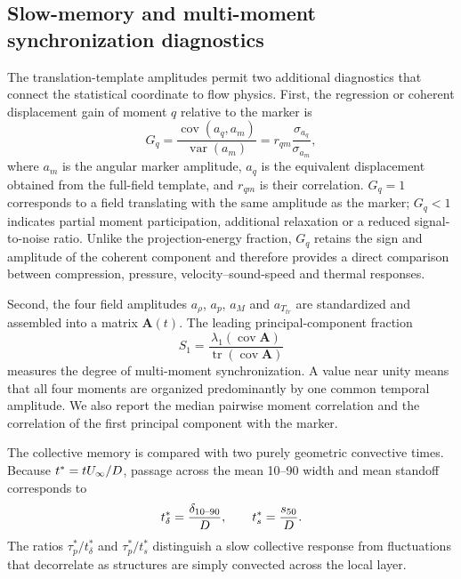 \subsection{Slow-memory and multi-moment synchronization diagnostics}
The translation-template amplitudes permit two additional diagnostics that connect the statistical coordinate to flow physics. First, the regression or coherent displacement gain of moment $q$ relative to the marker is
\begin{equation}
 G_q=\frac{\operatorname{cov}(a_q,a_m)}{\operatorname{var}(a_m)}
 =r_{qm}\frac{\sigma_{a_q}}{\sigma_{a_m}},
 \label{eq:gain}
\end{equation}
where $a_m$ is the angular marker amplitude, $a_q$ is the equivalent displacement obtained from the full-field template, and $r_{qm}$ is their correlation. $G_q=1$ corresponds to a field translating with the same amplitude as the marker; $G_q<1$ indicates partial moment participation, additional relaxation or a reduced signal-to-noise ratio. Unlike the projection-energy fraction, $G_q$ retains the sign and amplitude of the coherent component and therefore provides a direct comparison between compression, pressure, velocity--sound-speed and thermal responses.

Second, the four field amplitudes $a_\rho$, $a_p$, $a_M$ and $a_{T_{tr}}$ are standardized and assembled into a matrix $\bm A(t)$. The leading principal-component fraction
\begin{equation}
 S_1=\frac{\lambda_1(\operatorname{cov}\bm A)}{\operatorname{tr}(\operatorname{cov}\bm A)}
 \label{eq:synch}
\end{equation}
measures the degree of multi-moment synchronization. A value near unity means that all four moments are organized predominantly by one common temporal amplitude. We also report the median pairwise moment correlation and the correlation of the first principal component with the marker.

The collective memory is compared with two purely geometric convective times. Because $t^*=tU_\infty/D$, passage across the mean 10--90 width and mean standoff corresponds to
\begin{equation}
 t_\delta^*=\frac{\delta_{10\text{--}90}}{D},\qquad
 t_s^*=\frac{s_{50}}{D}.
 \label{eq:passage}
\end{equation}
The ratios $\tau_p^*/t_\delta^*$ and $\tau_p^*/t_s^*$ distinguish a slow collective response from fluctuations that decorrelate as structures are simply convected across the local layer.
